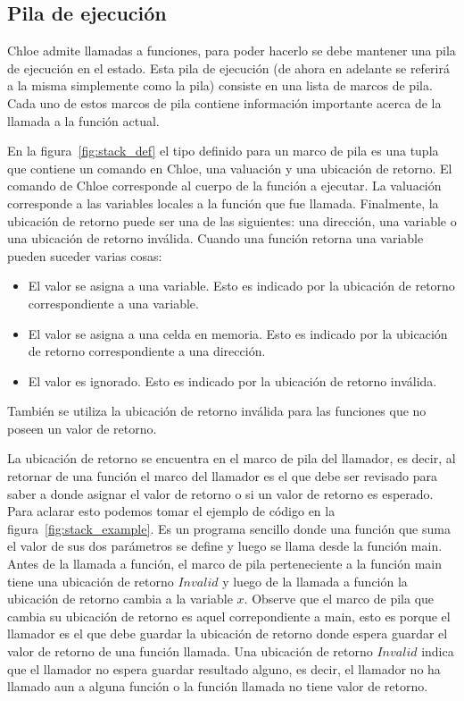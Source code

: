 \subsection{Pila de ejecución}\label{subsection:stack}

Chloe admite llamadas a funciones, para poder hacerlo se debe mantener una pila de ejecución en el estado.
Esta pila de ejecución (de ahora en adelante se referirá a la misma simplemente como la pila) consiste en una lista de marcos de pila.
Cada uno de estos marcos de pila contiene información importante acerca de la llamada a la función actual.

En la figura~\ref{fig:stack_def} el tipo definido para un marco de pila es una tupla que contiene un comando en Chloe, una valuación y una ubicación de retorno.
El comando de Chloe corresponde al cuerpo de la función a ejecutar.
La valuación corresponde a las variables locales a la función que fue llamada.
Finalmente, la ubicación de retorno puede ser una de las siguientes: una dirección, una variable o una ubicación de retorno inválida.
Cuando una función retorna una variable pueden suceder varias cosas:
\begin{itemize}
  \item{El valor se asigna a una variable.
  Esto es indicado por la ubicación de retorno correspondiente a una variable.}
  \item{El valor se asigna a una celda en memoria.
  Esto es indicado por la ubicación de retorno correspondiente a una dirección.}
  \item{El valor es ignorado.
  Esto es indicado por la ubicación de retorno inválida.}
\end{itemize}

También se utiliza la ubicación de retorno inválida para las funciones que no poseen un valor de retorno.

La ubicación de retorno se encuentra en el marco de pila del llamador, es decir, al retornar de una función el marco del llamador es el que debe ser revisado para saber a donde asignar el valor de retorno o si un valor de retorno es esperado.
Para aclarar esto podemos tomar el ejemplo de código en la figura~\ref{fig:stack_example}.
Es un programa sencillo donde una función que suma el valor de sus dos parámetros se define y luego se llama desde la función main.
Antes de la llamada a función, el marco de pila perteneciente a la función main tiene una ubicación de retorno $Invalid$ y luego de la llamada a función la ubicación de retorno cambia a la variable $x$.
Observe que el marco de pila que cambia su ubicación de retorno es aquel correpondiente a main, esto es porque el llamador es el que debe guardar la ubicación de retorno donde espera guardar el valor de retorno de una función llamada.
Una ubicación de retorno $Invalid$ indica que el llamador no espera guardar resultado alguno, es decir, el llamador no ha llamado aun a alguna función o la función llamada no tiene valor de retorno.

